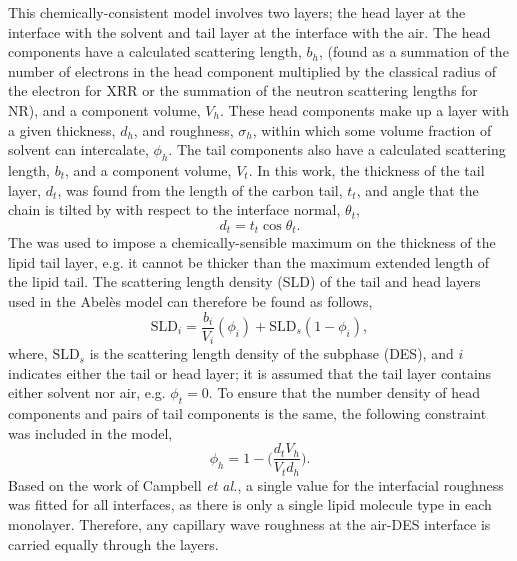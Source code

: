 \documentclass[twoside,twocolumn,9pt]{article}
\begin{document}
This chemically-consistent model involves two layers; the head layer at the interface with the solvent and tail layer at the interface with the air. The head components have a calculated scattering length, $b_h$, (found as a summation of the number of electrons in the head component multiplied by the classical radius of the electron for XRR or the summation of the neutron scattering lengths for NR), and a component volume, $V_h$. These head components make up a layer with a given thickness, $d_h$, and roughness, $\sigma_h$, within which some volume fraction of solvent can intercalate, $\phi_h$. The tail components also have a calculated scattering length, $b_t$, and a component volume, $V_t$. In this work, the thickness of the tail layer, $d_t$, was found from the length of the carbon tail, $t_t$, and angle that the chain is tilted by with respect to the interface normal, $\theta_t$,
%
\begin{equation}
\label{equ:tl}
d_t = t_t \cos{\theta_t}.
\end{equation}
%
The was used to impose a chemically-sensible maximum on the thickness of the lipid tail layer, e.g. it cannot be thicker than the maximum extended length of the lipid tail. The scattering length density (SLD) of the tail and head layers used in the Abel\`{e}s model can therefore be found as follows,
%
\begin{equation}
\text{SLD}_i = \frac{b_i}{V_i}(\phi_i) + \text{SLD}_{s}(1-\phi_i),
\end{equation}
%
where, $\text{SLD}_{s}$ is the scattering length density of the subphase (DES), and $i$ indicates either the tail or head layer; it is assumed that the tail layer contains either solvent nor air, e.g. $\phi_t = 0$. To ensure that the number density of head components and pairs of tail components is the same, the following constraint was included in the model,\cite{Braun2017}
%
\begin{equation}
\label{equ:phih}
\phi_h =  1 - \bigg(\frac{d_tV_h}{V_td_h}\bigg).
\end{equation}
%
Based on the work of Campbell \emph{et al.},\cite{Campbell2018} a single value for the interfacial roughness was fitted for all interfaces, as there is only a single lipid molecule type in each monolayer. Therefore, any capillary wave roughness at the air-DES interface is carried equally through the layers.
\end{document}
